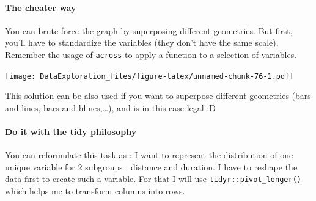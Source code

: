 \documentclass[
]{book}
\newenvironment{Shaded}{\begin{snugshade}}{\end{snugshade}}
\newcommand{\ControlFlowTok}[1]{\textcolor[rgb]{0.13,0.29,0.53}{\textbf{#1}}}
\newcommand{\DataTypeTok}[1]{\textcolor[rgb]{0.13,0.29,0.53}{#1}}
\newcommand{\KeywordTok}[1]{\textcolor[rgb]{0.13,0.29,0.53}{\textbf{#1}}}
\newcommand{\NormalTok}[1]{#1}
\newcommand{\OperatorTok}[1]{\textcolor[rgb]{0.81,0.36,0.00}{\textbf{#1}}}
\newcommand{\StringTok}[1]{\textcolor[rgb]{0.31,0.60,0.02}{#1}}
\begin{document}
\hypertarget{the-cheater-way}{%
\paragraph{The cheater way}\label{the-cheater-way}}

You can brute-force the graph by superposing different geometries. But first, you'll have to standardize the variables (they don't have the same scale). Remember the usage of \texttt{across} to apply a function to a selection of variables.

\begin{Shaded}
\end{Shaded}

\texttt{[image: DataExploration\_files/figure-latex/unnamed-chunk-76-1.pdf]}

This solution can be also used if you want to superpose different geometries (bars and lines, bars and hlines,\ldots), and is in this case legal :D

\hypertarget{do-it-with-the-tidy-philosophy}{%
\paragraph{Do it with the tidy philosophy}\label{do-it-with-the-tidy-philosophy}}

You can reformulate this task as : I want to represent the distribution of one unique variable for 2 subgroups : distance and duration. I have to reshape the data first to create such a variable. For that I will use \texttt{tidyr::pivot\_longer()} which helps me to transform columns into rows.
\end{document}
